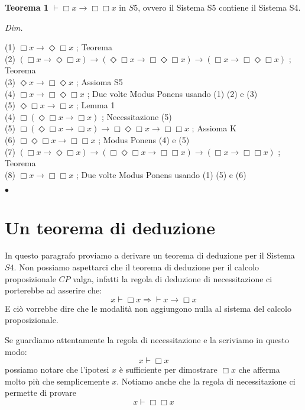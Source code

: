 \documentclass[a4paper, 12pt]{article}
\begin{document}
\begin{flushleft}
\textbf{Teorema 1}
$\vdash \Box x \rightarrow \Box \Box x$ in $S5$, ovvero il Sistema S5 contiene il Sistema S4.

\textit{Dim.}

(1) $\Box x \rightarrow \Diamond \Box x$ ; Teorema \\
(2) $(\Box x \rightarrow \Diamond \Box x) \rightarrow (\Diamond \Box x \rightarrow \Box\Diamond\Box x) \rightarrow (\Box x \rightarrow \Box \Diamond \Box x)$ ; Teorema \\
(3) $\Diamond x \rightarrow \Box \Diamond x$ ; Assioma S5 \\
(4) $\Box x \rightarrow \Box \Diamond \Box x$ ; Due volte Modus Ponens usando (1) (2) e (3) \\
(5) $\Diamond \Box x \rightarrow \Box x$ ; Lemma 1 \\
(4) $\Box (\Diamond \Box x \rightarrow \Box x)$ ; Necessitazione (5) \\
(5) $\Box(\Diamond\Box x \rightarrow \Box x) \rightarrow \Box \Diamond \Box x \rightarrow \Box \Box x$ ; Assioma K \\
(6) $\Box\Diamond\Box x \rightarrow \Box\Box x$ ; Modus Ponens (4) e (5) \\
(7) $(\Box x \rightarrow \Diamond \Box x) \rightarrow (\Box\Diamond\Box x \rightarrow \Box\Box x) \rightarrow (\Box x \rightarrow \Box\Box x)$ ; Teorema \\
(8) $\Box x \rightarrow \Box \Box x$ ; Due volte Modus Ponens usando (1) (5) e (6)

\begin{flushright}$\bullet$\end{flushright}
\end{flushleft}

\section{Un teorema di deduzione}
In questo paragrafo proviamo a derivare un teorema di deduzione per il Sistema $S4$.
Non possiamo aspettarci che il teorema di deduzione per il calcolo proposizionale $CP$ valga,
infatti la regola di deduzione di necessitazione ci porterebbe ad asserire che:
$$ x \vdash \Box x \Rightarrow \vdash x \rightarrow \Box x $$
E ciò vorrebbe dire che le modalità non aggiungono nulla al sistema del calcolo proposizionale.

Se guardiamo attentamente la regola di necessitazione e la scriviamo in questo modo:
$$x \vdash \Box x$$
possiamo notare che l'ipotesi $x$ è sufficiente per dimostrare $\Box x$ che afferma molto più
che semplicemente $x$.
Notiamo anche che la regola di necessitazione ci permette di provare
$$x \vdash \Box \Box x$$
\end{document}
